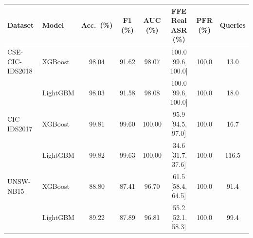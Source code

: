 \begin{tabular}{@{}llcccccc@{}}
\toprule
\textbf{Dataset} & \textbf{Model} & \textbf{Acc.\ (\%)} & \textbf{F1 (\%)} & \textbf{AUC (\%)} & \textbf{FFE Real ASR (\%)} & \textbf{PFR (\%)} & \textbf{Queries} \\
\midrule
CSE-CIC-IDS2018 & XGBoost & 98.04 & 91.62 & 98.07 & 100.0 [99.6, 100.0] & 100.0 & 13.0 \\
 & LightGBM & 98.03 & 91.58 & 98.08 & 100.0 [99.6, 100.0] & 100.0 & 18.0 \\
CIC-IDS2017 & XGBoost & 99.81 & 99.60 & 100.00 & 95.9 [94.5, 97.0] & 100.0 & 16.7 \\
 & LightGBM & 99.82 & 99.63 & 100.00 & 34.6 [31.7, 37.6] & 100.0 & 116.5 \\
UNSW-NB15 & XGBoost & 88.80 & 87.41 & 96.70 & 61.5 [58.4, 64.5] & 100.0 & 91.4 \\
 & LightGBM & 89.22 & 87.89 & 96.81 & 55.2 [52.1, 58.3] & 100.0 & 99.4 \\
\bottomrule
\end{tabular}
